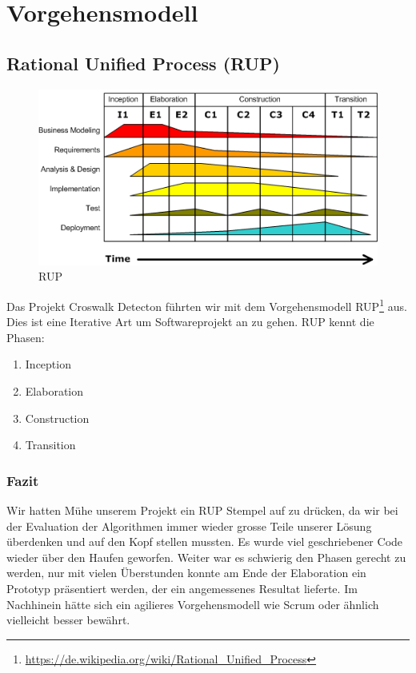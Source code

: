 \section{Vorgehensmodell}
\subsection{Rational Unified Process (RUP)}

\begin{figure}[H]
\centering
\includegraphics[width=\textwidth]{images/rup.png}
\caption[RUP]{RUP}
\end{figure}

Das Projekt Croswalk Detecton führten wir mit dem Vorgehensmodell RUP\footnote{\url{https://de.wikipedia.org/wiki/Rational_Unified_Process}} aus.
Dies ist eine Iterative Art um Softwareprojekt an zu gehen. RUP kennt die Phasen:

\begin{enumerate}
	\item Inception
	\item Elaboration
	\item Construction
	\item Transition
\end{enumerate}

\subsubsection{Fazit}
Wir hatten Mühe unserem Projekt ein RUP Stempel auf zu drücken, da wir bei der Evaluation der Algorithmen immer wieder grosse Teile unserer Lösung überdenken und auf den Kopf stellen mussten. Es wurde viel geschriebener Code wieder über den Haufen geworfen. Weiter war es schwierig den Phasen gerecht zu werden, nur mit vielen Überstunden konnte am Ende der Elaboration ein Prototyp präsentiert werden, der ein angemessenes Resultat lieferte. Im Nachhinein hätte sich ein agilieres Vorgehensmodell wie Scrum oder ähnlich vielleicht besser bewährt.
 

